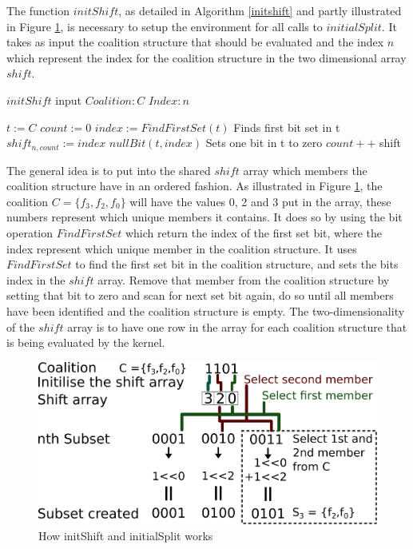 \documentclass{llncs}
\begin{document}
The function $initShift$, as detailed in Algorithm \ref{initshift} and partly illustrated in Figure \ref{fig:howitworks}, 
 is necessary to setup the environment for all calls to $initialSplit$.
 It takes as input the coalition structure that should be evaluated and the index $n$ which
represent the index for the coalition structure in the two dimensional array $shift$.
\begin{algorithm}
\caption{$initShift$ input $Coalition:C$ $Index:n$ \label{initshift}}
\begin{algorithmic}[1]
\STATE $t :=C$
\STATE $count := 0$
 { 
\STATE $index := FindFirstSet(t)$ \hfill Finds first bit set in t
\STATE $shift_{n,count} := index$ 
\STATE $nullBit(t,index)$ \hfill Sets one bit in t to zero
\STATE $count++$
}
\ENDWHILE
\RETURN shift
\end{algorithmic}
\end{algorithm}
The general idea is to put into the shared $shift$ array which members the coalition structure have in an ordered fashion. As illustrated in Figure \ref{fig:howitworks}, the coalition $C = \{f_3,f_2,f_0\}$ will have the values 0, 2 and 3 put in the array, these numbers represent which unique members it contains. It does so by using the bit operation $Find First Set$ which return the index of the first set bit, where the index represent which unique member in the coalition structure. It uses $Find First Set$ to find the first set bit in the coalition structure, and sets the bits index in the $shift$ array. Remove that member from the coalition structure by setting that bit to zero and scan for next set bit again, do so until all members have been identified and the coalition structure is empty. The two-dimensionality of the $shift$ array is to have one row in the array for each coalition structure that is being evaluated by the kernel. 
\begin{figure}[htbp]
\centering
\includegraphics[width=0.7\linewidth]{test}
\caption{How initShift and initialSplit works\label{fig:howitworks}}
\end{figure}
\end{document}

